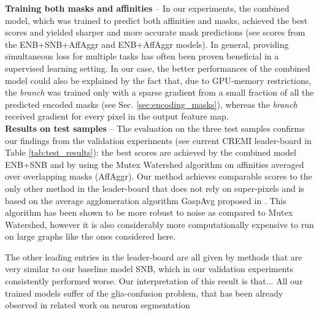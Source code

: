 \textbf{Training both masks and affinities} -- In our experiments, the combined model, which was trained to predict both affinities and \maskname masks, achieved the best scores and yielded sharper and more accurate mask predictions (see scores from the ENB+SNB+AffAggr and ENB+AffAggr models).
In general, providing simultaneous loss for multiple tasks has often been proven beneficial in a supervised learning setting.
In our case, the better performances of the combined model could also be explained by the fact that, due to GPU-memory restrictions, the \emph{\encBr branch} was trained only with a sparse gradient from a small fraction of all the predicted encoded masks (see Sec. \ref{sec:encoding_masks}), whereas the \emph{\sparseBr branch} received gradient for every pixel in the output feature map. \\





\textbf{Results on test samples} -- The evaluation on the three test samples confirms our findings from the validation experiments (see current CREMI leader-board in Table \ref{tab:test_results}): the best scores are achieved by the combined model ENB+SNB and by using the Mutex Watershed algorithm on affinities averaged over overlapping masks (AffAggr).
Our method achieves comparable scores to the only other method in the leader-board that does not rely on super-pixels and is based on the average agglomeration algorithm GaspAvg proposed in \cite{bailoni2019generalized}. This algorithm has been shown to be more robust to noise as compared to Mutex Watershed, however it is also considerably more computationally expensive to run on large graphs like the ones considered here. 

The other leading entries in the leader-board are all given by methods that are very similar to our baseline model SNB, which in our validation experiments consistently performed worse.
Our interpretation of this result is that... All our trained models suffer of the glia-confusion problem, that has been already observed in related work on neuron segmentation 



